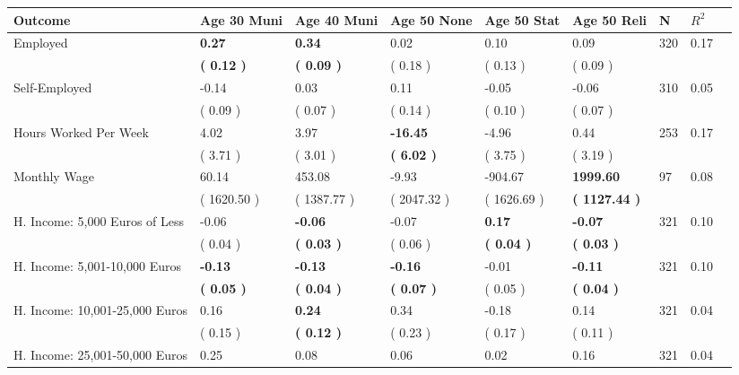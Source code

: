 \begin{tabular}{L{6.2cm} C{1.8cm} C{1.8cm} C{1.8cm} C{1.8cm} C{1.8cm} C{1.8cm} C{0.3cm} C{0.3cm}}
\toprule
 \textbf{Outcome} & \textbf{Age 30 Muni} & \textbf{Age 40 Muni} & \textbf{Age 50 None} & \textbf{Age 50 Stat} & \textbf{Age 50 Reli} & \textbf{N} & \textbf{$ R^2$} \\
\midrule
Employed & \textbf{     0.27} & \textbf{     0.34} &      0.02 &      0.10 &      0.09  & 320 &       0.17 \\ 
 & \textbf{(     0.12 )} & \textbf{(     0.09 )} & (     0.18 ) & (     0.13 ) & (     0.09 )  & \\
Self-Employed &     -0.14 &      0.03 &      0.11 &     -0.05 &     -0.06  & 310 &       0.05 \\ 
 & (     0.09 ) & (     0.07 ) & (     0.14 ) & (     0.10 ) & (     0.07 )  & \\
Hours Worked Per Week &      4.02 &      3.97 & \textbf{   -16.45} &     -4.96 &      0.44  & 253 &       0.17 \\ 
 & (     3.71 ) & (     3.01 ) & \textbf{(     6.02 )} & (     3.75 ) & (     3.19 )  & \\
Monthly Wage &     60.14 &    453.08 &     -9.93 &   -904.67 & \textbf{  1999.60}  & 97 &       0.08 \\ 
 & (  1620.50 ) & (  1387.77 ) & (  2047.32 ) & (  1626.69 ) & \textbf{(  1127.44 )}  & \\
H. Income: 5,000 Euros of Less &     -0.06 & \textbf{    -0.06} &     -0.07 & \textbf{     0.17} & \textbf{    -0.07}  & 321 &       0.10 \\ 
 & (     0.04 ) & \textbf{(     0.03 )} & (     0.06 ) & \textbf{(     0.04 )} & \textbf{(     0.03 )}  & \\
H. Income: 5,001-10,000 Euros & \textbf{    -0.13} & \textbf{    -0.13} & \textbf{    -0.16} &     -0.01 & \textbf{    -0.11}  & 321 &       0.10 \\ 
 & \textbf{(     0.05 )} & \textbf{(     0.04 )} & \textbf{(     0.07 )} & (     0.05 ) & \textbf{(     0.04 )}  & \\
H. Income: 10,001-25,000 Euros &      0.16 & \textbf{     0.24} &      0.34 &     -0.18 &      0.14  & 321 &       0.04 \\ 
 & (     0.15 ) & \textbf{(     0.12 )} & (     0.23 ) & (     0.17 ) & (     0.11 )  & \\
H. Income: 25,001-50,000 Euros &      0.25 &      0.08 &      0.06 &      0.02 &      0.16  & 321 &       0.04 \\ 

\end{tabular}

